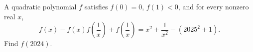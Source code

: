 A quadratic polynomial $f$ satisfies $f(0)=0$, $f(1)<0$, and for every nonzero real $x$,
\[
f(x)-f(x)f\left(\dfrac{1}{x}\right)+f\left(\dfrac{1}{x}\right)
=x^2+\dfrac{1}{x^2}-(2025^2+1).
\]
Find $f(2024)$.
